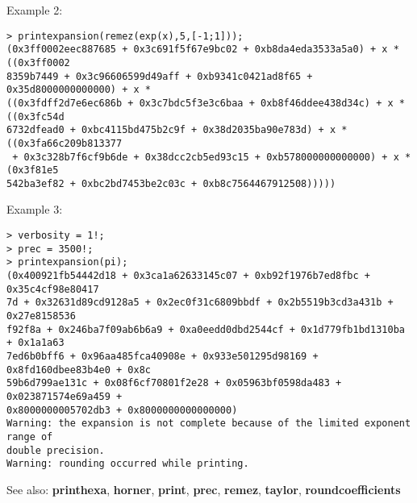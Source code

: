 \noindent Example 2: 
\begin{center}\begin{minipage}{15cm}\begin{Verbatim}[frame=single]
> printexpansion(remez(exp(x),5,[-1;1]));
(0x3ff0002eec887685 + 0x3c691f5f67e9bc02 + 0xb8da4eda3533a5a0) + x * ((0x3ff0002
8359b7449 + 0x3c96606599d49aff + 0xb9341c0421ad8f65 + 0x35d8000000000000) + x * 
((0x3fdff2d7e6ec686b + 0x3c7bdc5f3e3c6baa + 0xb8f46ddee438d34c) + x * ((0x3fc54d
6732dfead0 + 0xbc4115bd475b2c9f + 0x38d2035ba90e783d) + x * ((0x3fa66c209b813377
 + 0x3c328b7f6cf9b6de + 0x38dcc2cb5ed93c15 + 0xb578000000000000) + x * (0x3f81e5
542ba3ef82 + 0xbc2bd7453be2c03c + 0xb8c7564467912508)))))
\end{Verbatim}
\end{minipage}\end{center}
\noindent Example 3: 
\begin{center}\begin{minipage}{15cm}\begin{Verbatim}[frame=single]
> verbosity = 1!;
> prec = 3500!;
> printexpansion(pi);
(0x400921fb54442d18 + 0x3ca1a62633145c07 + 0xb92f1976b7ed8fbc + 0x35c4cf98e80417
7d + 0x32631d89cd9128a5 + 0x2ec0f31c6809bbdf + 0x2b5519b3cd3a431b + 0x27e8158536
f92f8a + 0x246ba7f09ab6b6a9 + 0xa0eedd0dbd2544cf + 0x1d779fb1bd1310ba + 0x1a1a63
7ed6b0bff6 + 0x96aa485fca40908e + 0x933e501295d98169 + 0x8fd160dbee83b4e0 + 0x8c
59b6d799ae131c + 0x08f6cf70801f2e28 + 0x05963bf0598da483 + 0x023871574e69a459 + 
0x8000000005702db3 + 0x8000000000000000)
Warning: the expansion is not complete because of the limited exponent range of 
double precision.
Warning: rounding occurred while printing.
\end{Verbatim}
\end{minipage}\end{center}
See also: \textbf{printhexa}, \textbf{horner}, \textbf{print}, \textbf{prec}, \textbf{remez}, \textbf{taylor}, \textbf{roundcoefficients}
